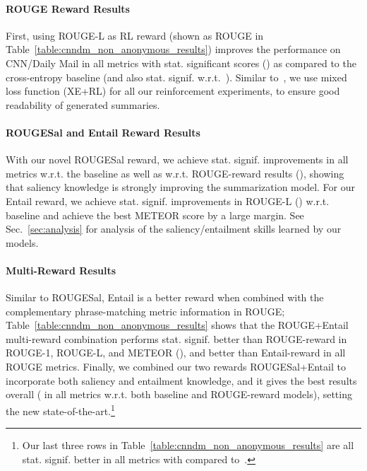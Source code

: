 \documentclass[11pt,a4paper]{article}
\begin{document}
\paragraph{ROUGE Reward Results}
First, using ROUGE-L as RL reward (shown as ROUGE in Table~\ref{table:cnndm_non_anonymous_results}) improves the performance on CNN/Daily Mail in all metrics with stat. significant scores () as compared to the cross-entropy baseline (and also stat. signif. w.r.t.~). Similar to~, we use mixed loss function (XE+RL) for all our reinforcement experiments, to ensure good readability of generated summaries.

\paragraph{ROUGESal and Entail Reward Results}
With our novel ROUGESal reward, we achieve stat. signif. improvements in all metrics w.r.t. the baseline as well as w.r.t. ROUGE-reward results (), showing that saliency knowledge is strongly improving the summarization model. For our Entail reward, we achieve stat. signif. improvements in ROUGE-L () w.r.t. baseline and achieve the best METEOR score by a large margin. See Sec.~\ref{sec:analysis} for analysis of the saliency/entailment skills learned by our models.



\paragraph{Multi-Reward Results}
Similar to ROUGESal, Entail is a better reward when combined with the complementary phrase-matching metric information in ROUGE; Table~\ref{table:cnndm_non_anonymous_results} shows that the ROUGE+Entail multi-reward combination performs stat. signif. better than ROUGE-reward in ROUGE-1, ROUGE-L, and METEOR (), and better than Entail-reward in all ROUGE metrics. Finally, we combined our two rewards ROUGESal+Entail to incorporate both saliency and entailment knowledge, and it gives the best results overall ( in all metrics w.r.t. both baseline and ROUGE-reward models), setting the new state-of-the-art.\footnote{Our last three rows in Table~\ref{table:cnndm_non_anonymous_results} are all stat. signif. better in all metrics with  compared to~.}
\end{document}

